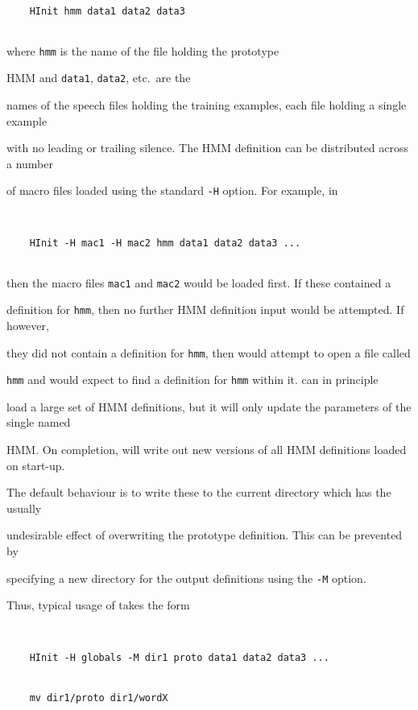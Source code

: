 \begin{verbatim}


    HInit hmm data1 data2 data3


\end{verbatim}


where \texttt{hmm} is the name of the file holding the prototype


HMM and \texttt{data1}, \texttt{data2}, etc.\  are the


names of the speech files holding the training examples, each file holding a single example


with no leading or trailing silence.  The HMM definition can be distributed across a number


of macro files loaded using the standard \texttt{-H} option.  For example, in


\begin{verbatim}


    HInit -H mac1 -H mac2 hmm data1 data2 data3 ...


\end{verbatim}


then the macro files \texttt{mac1} and \texttt{mac2} would be loaded first.  If these contained a


definition for \texttt{hmm}, then no further HMM definition input would be attempted.  If however,


they did not contain a definition for \texttt{hmm}, then  would attempt to open a file called


\texttt{hmm} and would expect to find a definition for \texttt{hmm} within it.   can in principle


load a large set of HMM definitions, but it will only update the parameters of the single named


HMM.  On completion,  will write out new versions of all HMM definitions loaded on start-up.


The default behaviour is to write these to the current directory which has the usually


undesirable effect of overwriting the prototype definition.  This can be prevented by


specifying a new directory for the output definitions using the \texttt{-M} option.


Thus, typical usage of  takes the form 


\begin{verbatim}


    HInit -H globals -M dir1 proto data1 data2 data3 ...


    mv dir1/proto dir1/wordX


\end{verbatim}


